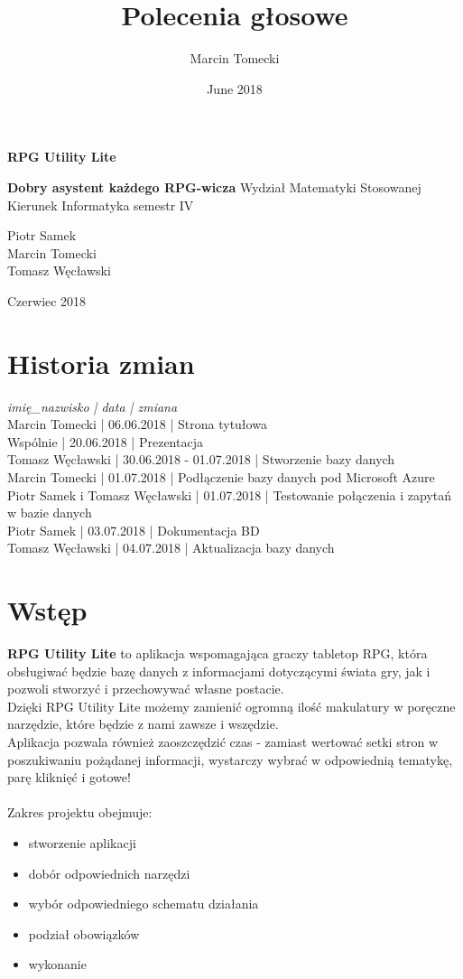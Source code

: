 \documentclass{article}
\title{Polecenia głosowe}
\author{Marcin Tomecki}
\date{June 2018}
\begin{document}
\begin{titlepage}
\centering
\Huge \textbf{RPG Utility Lite}\par
\Large \textbf{Dobry asystent każdego RPG-wicza}
\vfill
Wydział Matematyki Stosowanej\\Kierunek Informatyka semestr IV\par
\vfill
\vfill
\begin{flushright}
Piotr Samek\\
Marcin Tomecki\\
Tomasz Węcławski
\end{flushright}
Czerwiec 2018
\end{titlepage}
\tableofcontents
\newpage
\clearpage
\section{Historia zmian}
\textit{imię\_nazwisko | data | zmiana}\\
Marcin Tomecki                 | 06.06.2018              | Strona tytułowa\\
Wspólnie                       | 20.06.2018              | Prezentacja\\
Tomasz Węcławski               | 30.06.2018 - 01.07.2018 | Stworzenie bazy danych\\
Marcin Tomecki                 | 01.07.2018              | Podłączenie bazy danych pod Microsoft Azure\\
Piotr Samek i Tomasz Węcławski | 01.07.2018              | Testowanie połączenia i zapytań w bazie danych\\
Piotr Samek                    | 03.07.2018              | Dokumentacja BD\\
Tomasz Węcławski               | 04.07.2018              | Aktualizacja bazy danych
\newpage
\section{Wstęp}
\textbf{RPG Utility Lite} to aplikacja wspomagająca graczy tabletop RPG, która
obsługiwać będzie bazę danych z informacjami dotyczącymi świata gry, jak i pozwoli
stworzyć i przechowywać własne postacie.
\\Dzięki RPG Utility Lite możemy zamienić ogromną ilość makulatury w poręczne narzędzie, które będzie z nami zawsze i wszędzie.
\\Aplikacja pozwala również zaoszczędzić czas - zamiast wertować setki stron w poszukiwaniu pożądanej informacji, wystarczy wybrać w odpowiednią tematykę, parę kliknięć i gotowe!
\\\\Zakres projektu obejmuje:
\begin{itemize}
    \item stworzenie aplikacji
    \item dobór odpowiednich narzędzi
    \item wybór odpowiedniego schematu działania
    \item podział obowiązków
    \item wykonanie
\end{itemize}
\end{document}
